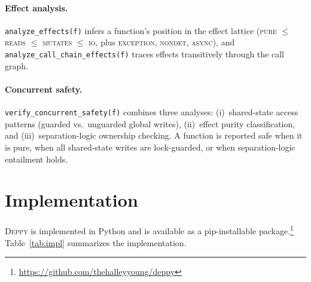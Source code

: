 \documentclass[acmsmall,nonacm,screen]{acmart}
\newcommand{\deppy}{\textsc{Deppy}}
\begin{document}
\paragraph{Effect analysis.}
\texttt{analyze\_effects(f)} infers a function's position in the
effect lattice
(\textsc{pure} $\le$ \textsc{reads} $\le$ \textsc{mutates} $\le$
\textsc{io}, plus \textsc{exception}, \textsc{nondet},
\textsc{async}), and \texttt{analyze\_call\_chain\_effects(f)} traces
effects transitively through the call graph.

\paragraph{Concurrent safety.}
\texttt{verify\_concurrent\_safety(f)} combines three analyses:
(i)~shared-state access patterns (guarded vs.\ unguarded global
writes), (ii)~effect purity classification, and
(iii)~separation-logic ownership checking.
A function is reported safe when it is pure, when all shared-state
writes are lock-guarded, or when separation-logic entailment holds.



\section{Implementation}\label{sec:impl}

\deppy{} is implemented in Python and is available as a pip-installable
package.\footnote{\url{https://github.com/thehalleyyoung/deppy}}
Table~\ref{tab:impl} summarizes the implementation.
\end{document}
